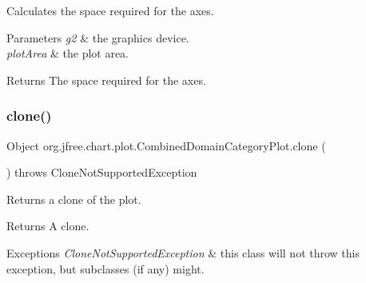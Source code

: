 Calculates the space required for the axes.


\begin{DoxyParams}{Parameters}
{\em g2} & the graphics device. \\
\hline
{\em plot\+Area} & the plot area.\\
\hline
\end{DoxyParams}
\begin{DoxyReturn}{Returns}
The space required for the axes. 
\end{DoxyReturn}
\mbox{\label{classorg_1_1jfree_1_1chart_1_1plot_1_1_combined_domain_category_plot_a7a0baa8cb7fd6bdfe048955ded93b877}} 
\subsubsection{\texorpdfstring{clone()}{clone()}}
{\footnotesize\ttfamily Object org.\+jfree.\+chart.\+plot.\+Combined\+Domain\+Category\+Plot.\+clone (\begin{DoxyParamCaption}{ }\end{DoxyParamCaption}) throws Clone\+Not\+Supported\+Exception}

Returns a clone of the plot.

\begin{DoxyReturn}{Returns}
A clone.
\end{DoxyReturn}

\begin{DoxyExceptions}{Exceptions}
{\em Clone\+Not\+Supported\+Exception} & this class will not throw this exception, but subclasses (if any) might. \\
\hline
\end{DoxyExceptions}
\mbox{\label{classorg_1_1jfree_1_1chart_1_1plot_1_1_combined_domain_category_plot_a5c12a31d133d4fa05fe7a4e5e8be15e8}} 
